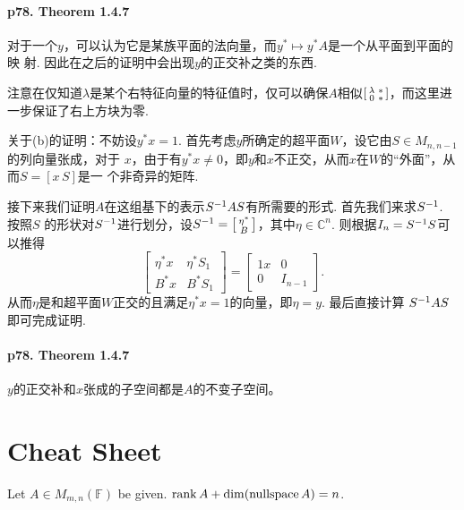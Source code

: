   \paragraph{p78. Theorem 1.4.7}
    对于一个$y$，可以认为它是某族平面的法向量，而$y^*\mapsto y^*A$是一个从平面到平面的映
    射. 因此在之后的证明中会出现$y$的正交补之类的东西. \par
    注意在仅知道$\lambda$是某个右特征向量的特征值时，仅可以确保$A$相似$\begin{bsmallmatrix}
    \lambda & * \\ 0 & *  \end{bsmallmatrix}$，而这里进一步保证了右上方块为零. \par
    关于(b)的证明：不妨设$y^*x = 1$.
    首先考虑$y$所确定的超平面$W$，设它由$S\in M_{n,n-1}$的列向量张成，对于
    $x$，由于有$y^*x\ne 0$，即$y$和$x$不正交，从而$x$在$W$的“外面”，从而$S=[x\, S]$是一
    个非奇异的矩阵. \par
    接下来我们证明$A$在这组基下的表示$S^{-1} AS$有所需要的形式. 首先我们来求$S^{-1}$. 按照$S$
    的形状对$S^{-1}$进行划分，设$S^{-1} = \begin{bsmallmatrix} \eta^* \\ B
    \end{bsmallmatrix}$，其中$\eta\in\mathbb{C}^n$. 则根据$I_n=S^{-1} S$可以推得
    \[
      \begin{bmatrix}
        \eta^* x & \eta^*S_1 \\ B^* x & B^* S_1
      \end{bmatrix}
      =
      \begin{bmatrix}
        1 x & 0 \\ 0 & I_{n-1}
      \end{bmatrix}.
    \]
    从而$\eta$是和超平面$W$正交的且满足$\eta^* x =1$的向量，即$\eta=y$. 最后直接计算
    $S^{-1} AS$即可完成证明. 
  \paragraph{p78. Theorem 1.4.7}
    $y$的正交补和$x$张成的子空间都是$A$的不变子空间。




\newpage
\section{Cheat Sheet}
  \begin{thm}
    Let $A\in M_{m,n}(\mathbb{F})$ be given. $\operatorname{rank} A + \dim(\operatorname{nullspace} A) = n$.
  \end{thm}

